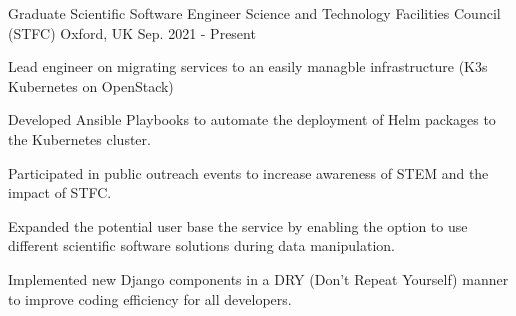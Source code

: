 

\begin{cventries}

    \cventry
    {Graduate Scientific Software Engineer} %
    {Science and Technology Facilities Council (STFC)} %
    {Oxford, UK} %
    {Sep. 2021 - Present} %
    {
        \begin{cvitems} %
            \item Lead engineer on migrating services to an easily managble infrastructure (K3s Kubernetes on OpenStack)
            \item Developed Ansible Playbooks to automate the deployment of Helm packages to the Kubernetes cluster.
            \item Participated in public outreach events to increase awareness of STEM and the impact of STFC.
            \item Expanded the potential user base the service by enabling the option to use different scientific software solutions during data manipulation.
            \item Implemented new Django components in a DRY (Don't Repeat Yourself) manner to improve coding efficiency for all developers.
        \end{cvitems}
    }
\end{cventries}
